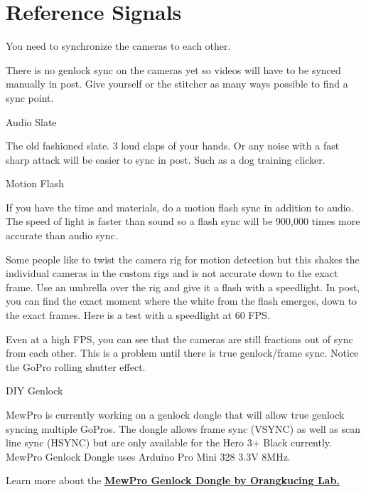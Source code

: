 \chapter{Reference Signals}
\pagecolor{white}
\label{chap:22}
\begin{fullwidth}


\problem

{\large You need to synchronize the cameras to each other. \par}

There is no genlock sync on the cameras yet so videos will have to be synced manually in post. Give yourself or the stitcher as many ways possible to find a sync point. 

\solution

{\large Audio Slate \par}

The old fashioned slate. 3 loud claps of your hands. Or any noise with a fast sharp attack will be easier to sync in post. Such as a dog training clicker.

{\large Motion Flash \par}

If you have the time and materials, do a motion flash sync in addition to audio. The speed of light is faster than sound so a flash sync will be 900,000 times more accurate than audio sync. 

Some people like to twist the camera rig for motion detection but this shakes the individual cameras in the custom rigs and is not accurate down to the exact frame. 
Use an umbrella over the rig and give it a flash with a speedlight. In post, you can find the exact moment where the white from the flash emerges, down to the exact frames. 
\clearpage
Here is a test with a speedlight at 60 FPS. 


Even at a high FPS, you can see that the cameras are still fractions out of sync from each other. This is a problem until there is true genlock/frame sync. Notice the GoPro rolling shutter effect. 

{\large DIY Genlock \par}

MewPro is currently working on a genlock dongle that will allow true genlock syncing multiple GoPros. The dongle allows frame sync (VSYNC) as well as scan line sync (HSYNC) but are only available for the Hero 3+ Black currently. MewPro Genlock Dongle uses Arduino Pro Mini 328 3.3V 8MHz.

Learn more about the \textbf{\href{http://mewpro.cc/2015/03/20/how-to-use-mewpro-genlock-dongle/}{MewPro Genlock Dongle by Orangkucing Lab.}}


\clearpage
\end{fullwidth}

